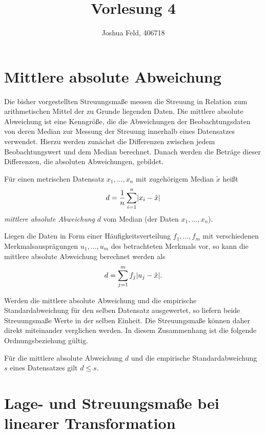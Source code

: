 \documentclass{lecture}
\institute{Institut für Statistik und Wirtschaftsmathematik}
\title{Vorlesung 4}
\author{Joshua Feld, 406718}
\begin{document}
    \maketitle


    \section*{Mittlere absolute Abweichung}

    Die bisher vorgestellten Streuungsmaße messen die Streuung in Relation zum arithmetischen Mittel der zu Grunde liegenden Daten.
    Die mittlere absolute Abweichung ist eine Kenngröße, die die Abweichungen der Beobachtungsdaten von deren Median zur Messung der Streuung innerhalb eines Datensatzes verwendet.
    Hierzu werden zunächst die Differenzen zwischen jedem Beobachtungswert und dem Median berechnet.
    Danach werden die Beträge dieser Differenzen, die absoluten Abweichungen, gebildet.

    \begin{definition}
        Für einen metrischen Datensatz \(x_1, \ldots, x_n\) mit zugehörigem Median \(\tilde{x}\) heißt
        \[
            d = \frac{1}{n}\sum_{i = 1}^n \absolute*{x_i - \tilde{x}}
        \]
        \emph{mittlere absolute Abweichung} \(d\) vom Median (der Daten \(x_1, \ldots, x_n\)).
    \end{definition}

    \begin{calcrule}
        Liegen die Daten in Form einer Häufigkeitsverteilung \(f_1, \ldots, f_m\) mit verschiedenen Merkmalsausprägungen \(u_1, \ldots, u_m\) des betrachteten Merkmals vor, so kann die mittlere absolute Abweichung berechnet werden als
        \[
            d = \sum_{j = 1}^m f_j\absolute*{u_j - \tilde{x}}.
        \]
    \end{calcrule}

    Werden die mittlere absolute Abweichung und die empirische Standardabweichung für den selben Datensatz ausgewertet, so liefern beide Streuungsmaße Werte in der selben Einheit.
    Die Streuungsmaße können daher direkt miteinander verglichen werden.
    In diesem Zusammenhang ist die folgende Ordnungsbeziehung gültig.

    \begin{calcrule}
        Für die mittlere absolute Abweichung \(d\) und die empirische Standardabweichung \(s\) eines Datensatzes gilt \(d \le s\).
    \end{calcrule}


    \section*{Lage- und Streuungsmaße bei linearer Transformation}
\end{document}
